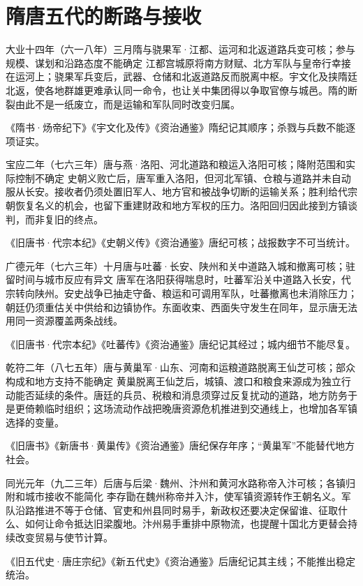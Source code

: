 \section{隋唐五代的断路与接收}
\begin{event}{}{大业十四年（六一八年）三月}{隋与骁果军·江都、运河和北返道路}{兵变可核；参与规模、谋划和沿路态度不能确定}
江都宫城原将南方财赋、北方军队与皇帝行幸接在运河上；骁果军兵变后，武器、仓储和北返道路反而脱离中枢。宇文化及挟隋廷北返，使各地群雄更难承认同一命令，也让关中集团得以争取官僚与城邑。隋的断裂由此不是一纸废立，而是运输和军队同时改变归属。

《隋书·炀帝纪下》《宇文化及传》《资治通鉴》隋纪记其顺序；杀戮与兵数不能逐项证实。
\end{event}
\begin{event}{}{宝应二年（七六三年）}{唐与燕·洛阳、河北道路和粮运}{入洛阳可核；降附范围和实际控制不确定}
史朝义败亡后，唐军重入洛阳，但河北军镇、仓粮与道路并未自动服从长安。接收者仍须处置旧军人、地方官和被战争切断的运输关系；胜利给代宗朝恢复名义的机会，也留下重建财政和地方军权的压力。洛阳回归因此接到方镇谈判，而非复旧的终点。

《旧唐书·代宗本纪》《史朝义传》《资治通鉴》唐纪可核；战报数字不可当统计。
\end{event}
\begin{event}{}{广德元年（七六三年）十月}{唐与吐蕃·长安、陕州和关中道路}{入城和撤离可核；驻留时间与城市反应有异文}
唐军在洛阳获得喘息时，吐蕃军沿关中道路入长安，代宗转向陕州。安史战争已抽走守备、粮运和可调用军队，吐蕃撤离也未消除压力；朝廷仍须重估关中供给和边镇协作。东面收束、西面失守发生在同年，显示唐无法用同一资源覆盖两条战线。

《旧唐书·代宗本纪》《吐蕃传》《资治通鉴》唐纪记其经过；城内细节不能尽复。
\end{event}
\begin{event}{}{乾符二年（八七五年）}{唐与黄巢军·山东、河南和运粮道路}{脱离王仙芝可核；部众构成和地方支持不能确定}
黄巢脱离王仙芝后，城镇、渡口和粮食来源成为独立行动能否延续的条件。唐廷的兵员、税粮和消息须穿过反复扰动的道路，地方防务于是更倚赖临时组织；这场流动作战把晚唐资源危机推进到交通线上，也增加各军镇选择的变量。

《旧唐书》《新唐书·黄巢传》《资治通鉴》唐纪保存年序；“黄巢军”不能替代地方社会。
\end{event}
\begin{event}{}{同光元年（九二三年）}{后唐与后梁·魏州、汴州和黄河水路}{称帝入汴可核；各镇归附和城市接收不能简化}
李存勖在魏州称帝并入汴，使军镇资源转作王朝名义。军队沿路推进不等于仓储、官吏和州县同时易手，新政权还要决定保留谁、征取什么、如何让命令抵达旧梁腹地。汴州易手重排中原物流，也提醒十国北方更替会持续改变贸易与使节计算。

《旧五代史·唐庄宗纪》《新五代史》《资治通鉴》后唐纪记其主线；不能推出稳定统治。
\end{event}
